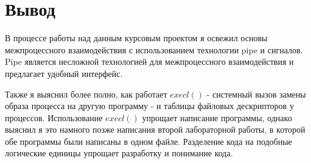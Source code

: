 \section{Вывод}

В процессе работы над данным курсовым проектом я освежил основы межпроцессного взаимодействия с использованием технологии pipe и сигналов. Pipe является несложной технологией для межпроцессного взаимодействия и предлагает удобный интерфейс.

Также я выяснил более полно, как работает $execl()$ - системный вызов замены образа процесса на другую программу - и таблицы файловых дескрипторов у процессов. Использование $execl()$ упрощает написание программы, однако выяснил я это намного позже написания второй лабораторной работы, в которой обе программы были написаны в одном файле. Разделение кода на подобные логические единицы упрощает разработку и понимание кода. 

